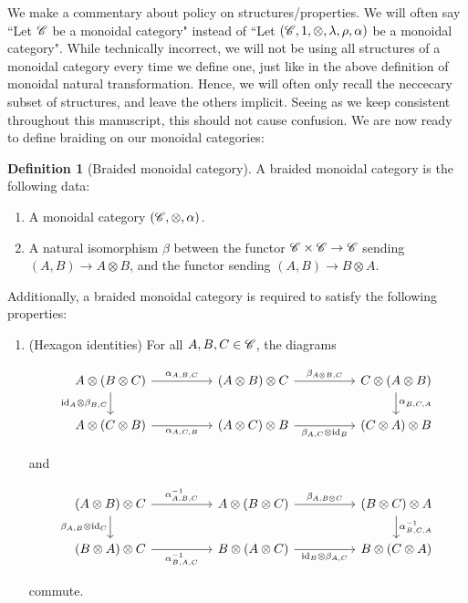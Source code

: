 \documentclass{article}
\theoremstyle{definition}
\newtheorem*{definition}{Definition}
\numberwithin{figure}{section}
\begin{document}
We make a commentary about policy on structures/properties. We will often say ``Let $\mathscr{C}$ be a monoidal category" instead of ``Let $(\mathscr{C},1,\otimes,\lambda,\rho,\alpha)$ be a monoidal category". While technically incorrect, we will not be using all structures of a monoidal category every time we define one, just like in the above definition of monoidal natural transformation. Hence, we will often only recall the neccecary subset of structures, and leave the others implicit. Seeing as we keep consistent throughout this manuscript, this should not cause confusion. We are now ready to define braiding on our monoidal categories:

\begin{definition}[Braided monoidal category] A braided monoidal category is the following data:

\begin{enumerate}
\item A monoidal category $(\mathscr{C},\otimes,\alpha)$.
\item A natural isomorphism $\beta$ between the functor $\mathscr{C}\times \mathscr{C}\to \mathscr{C}$ sending $(A,B)\to A\otimes B$, and the functor sending $(A,B)\to B\otimes A$.
\end{enumerate}

Additionally, a braided monoidal category is required to satisfy the following properties:

\begin{enumerate}
\item (Hexagon identities) For all $A,B,C\in \mathscr{C}$, the diagrams

\[\begin{tikzcd}
	{A\otimes (B\otimes C)} && {(A\otimes B)\otimes C} && {C\otimes (A\otimes B)} \\
	{A\otimes (C\otimes B)} && {(A\otimes C)\otimes B} && {(C\otimes A)\otimes B}
	\arrow["{\alpha_{A,B,C}}", from=1-1, to=1-3]
	\arrow["{\beta_{A\otimes B,C}}", from=1-3, to=1-5]
	\arrow["{\alpha^{}_{B,C,A}}", from=1-5, to=2-5]
	\arrow["{\id_A\otimes \beta_{B,C}}"', from=1-1, to=2-1]
	\arrow["{\alpha_{A,C,B}}"', from=2-1, to=2-3]
	\arrow["{\beta_{A,C}\otimes \id_B}"', from=2-3, to=2-5]
\end{tikzcd}\]

and

\[\begin{tikzcd}
	{(A\otimes B)\otimes C} && {A\otimes (B\otimes C)} && {(B\otimes C)\otimes A} \\
	{(B\otimes A)\otimes C} && {B\otimes (A\otimes C)} && {B\otimes (C\otimes A)}
	\arrow["{\alpha^{-1}_{A,B,C}}", from=1-1, to=1-3]
	\arrow["{\beta_{A,B\otimes C}}", from=1-3, to=1-5]
	\arrow["{\alpha^{-1}_{B,C,A}}", from=1-5, to=2-5]
	\arrow["{\beta_{A,B}\otimes \id_C}"', from=1-1, to=2-1]
	\arrow["{\alpha^{-1}_{B,A,C}}"', from=2-1, to=2-3]
	\arrow["{\id_B\otimes \beta_{A,C}}"', from=2-3, to=2-5]
\end{tikzcd}\]

commute.
\end{enumerate}

\raggedleft\qedsymbol{}
\end{definition}
\end{document}
